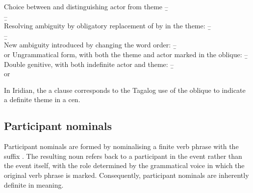 \pex[interpartskip=0pt]
    \a Choice between \Obl{} and \Gen{} distinguishing actor from theme
    \beginsubsub{}
        \b{--}{\\ }
        \b{--}{\\ }
    \endsubsub
    \a Resolving ambiguity by obligatory replacement of \Gen{} by \Obl{} in the theme:
    \beginsubsub
        \b{--}{\\
        }
        \b{--}{\\
        }
    \endsubsub
    \a New ambiguity introduced by changing the word order:
    \beginsubsub
        \b{--} {\\
         or }
    \endsubsub
    \a Ungrammatical form, with both the theme and actor marked in the oblique:
    \beginsubsub
        \b{--}{\ljudge{*}\\
        }
    \endsubsub
    \a Double genitive, with both indefinite actor and theme:
    \beginsubsub
        \b{--}{\\
         or } 
    \endsubsub
\xe


In Iridian, the a  clause corresponds to the Tagalog use of the oblique to indicate a definite theme in a {\sc cen}. 




\subsection{Participant nominals}

Participant nominals are formed by nominalising a finite verb phrase with the suffix . The resulting noun refers back to a participant in the event rather than the event itself, with the role determined by the grammatical voice in which the original verb phrase is marked. Consequently, participant nominals are inherently definite in meaning.

